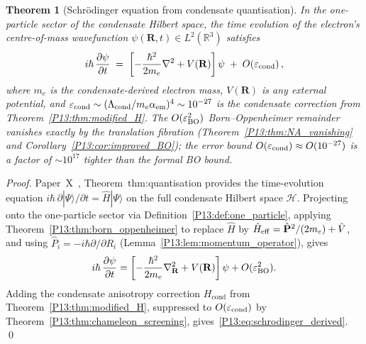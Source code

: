 \documentclass[11pt,a4paper]{article}
\newtheorem{theorem}{Theorem}[section]
\theoremstyle{definition}
\theoremstyle{remark}
\newcommand{\Lcond}{\Lambda_{\mathrm{cond}}}
\newcommand{\aem}{\alpha_{\mathrm{em}}}
\newcommand{\eps}{\varepsilon}
\newcommand{\Hcond}{H_{\mathrm{cond}}}
\begin{document}
\begin{theorem}[Schr\"odinger equation from condensate quantisation]
\label{P13:thm:schrodinger}
In the one-particle sector of the condensate Hilbert space,
the time evolution of the electron's centre-of-mass wavefunction
$\psi(\mathbf{R},t)\in L^2(\mathbb{R}^3)$ satisfies
\begin{equation}
  i\hbar\,\frac{\partial\psi}{\partial t}
  \;=\;
  \left[-\frac{\hbar^2}{2m_e}\nabla^2 + V(\mathbf{R})\right]\psi
  \;+\; O\!\left(\eps_{\rm cond}\right),
  \label{P13:eq:schrodinger_derived}
\end{equation}
where $m_e$ is the condensate-derived electron mass,
$V(\mathbf{R})$ is any external potential,
and $\eps_{\rm cond}\sim(\Lcond/m_e\aem)^4\sim10^{-27}$ is the
condensate correction from Theorem~\ref{P13:thm:modified_H}.
The $O(\eps_{\rm BO}^2)$ Born--Oppenheimer remainder vanishes exactly
by the translation fibration (Theorem~\ref{P13:thm:NA_vanishing}
and Corollary~\ref{P13:cor:improved_BO}); the error bound
$O(\eps_{\rm cond})\approx O(10^{-27})$ is a factor of
$\sim10^{17}$ tighter than the formal BO bound.
\end{theorem}

\begin{proof}
Paper~X~\cite{Paper10}, Theorem~thm:quantisation provides the time-evolution
equation $i\hbar\,\partial|\Psi\rangle/\partial t = \hat{H}|\Psi\rangle$
on the full condensate Hilbert space $\mathcal{H}$.
Projecting onto the one-particle sector via Definition~\ref{P13:def:one_particle},
applying Theorem~\ref{P13:thm:born_oppenheimer} to replace $\hat{H}$
by $\hat{H}_{\rm eff} = \hat{\mathbf{P}}^2/(2m_e)+\hat{V}$,
and using $\hat{P}_i = -i\hbar\partial/\partial R_i$
(Lemma~\ref{P13:lem:momentum_operator}), gives
\begin{equation*}
  i\hbar\,\frac{\partial\psi}{\partial t}
  = \left[-\frac{\hbar^2}{2m_e}\nabla_\mathbf{R}^2 + V(\mathbf{R})\right]\psi
  + O(\eps_{\rm BO}^2).
\end{equation*}
Adding the condensate anisotropy correction $\Hcond$ from
Theorem~\ref{P13:thm:modified_H}, suppressed to $O(\eps_{\rm cond})$
by Theorem~\ref{P13:thm:chameleon_screening}, gives~\eqref{P13:eq:schrodinger_derived}.
\qed
\end{proof}
\end{document}
